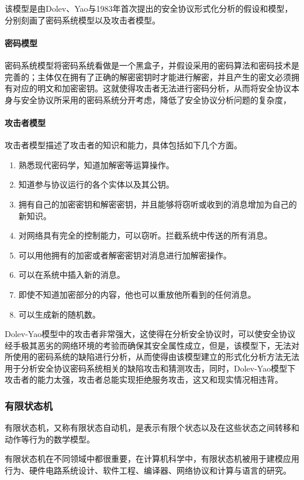\documentclass[cs4size,a4pape,UTF8]{ctexart}
\numberwithin{equation}{section}
\numberwithin{table}{section}
\numberwithin{figure}{section}
\begin{document}
该模型是由Dolev、Yao与1983年首次提出的安全协议形式化分析的假设和模型，分别刻画了密码系统模型以及攻击者模型。

\paragraph{密码模型}
密码系统模型将密码系统看做是一个黑盒子，并假设采用的密码算法和密码技术是完善的；主体仅在拥有了正确的解密密钥时才能进行解密，并且产生的密文必须拥有对应的明文和加密密钥。这就使得攻击者无法进行密码分析，从而将安全协议本身与安全协议所采用的密码系统分开考虑，降低了安全协议分析问题的复杂度，

\paragraph{攻击者模型}
攻击者模型描述了攻击者的知识和能力，具体包括如下几个方面。

\begin{enumerate}[(1)]
\item 熟悉现代密码学，知道加解密等运算操作。
\item 知道参与协议运行的各个实体以及其公钥。
\item 拥有自己的加密密钥和解密密钥，并且能够将窃听或收到的消息增加为自己的新知识。
\item 对网络具有完全的控制能力，可以窃听。拦截系统中传送的所有消息。
\item 可以用他拥有的加密或者解密密钥对消息进行加解密操作。
\item 可以在系统中插入新的消息。
\item 即使不知道加密部分的内容，他也可以重放他所看到的任何消息。
\item 可以生成新的随机数。
\end{enumerate}

Dolev-Yao模型中的攻击者非常强大，这使得在分析安全协议时，可以使安全协议经手极其恶劣的网络环境的考验而确保其安全属性成立，但是，该模型下，无法对所使用的密码系统的缺陷进行分析，从而使得由该模型建立的形式化分析方法无法用于分析安全协议密码系统相关的缺陷攻击和猜测攻击，同时，Dolev-Yao模型下攻击者的能力太强，攻击者总能实现拒绝服务攻击，这又和现实情况相违背。
\subsubsection{有限状态机}
有限状态机，又称有限状态自动机，是表示有限个状态以及在这些状态之间转移和动作等行为的数学模型。

有限状态机在不同领域中都很重要，在计算机科学中，有限状态机被用于建模应用行为、硬件电路系统设计、软件工程、编译器、网络协议和计算与语言的研究。
\end{document}
